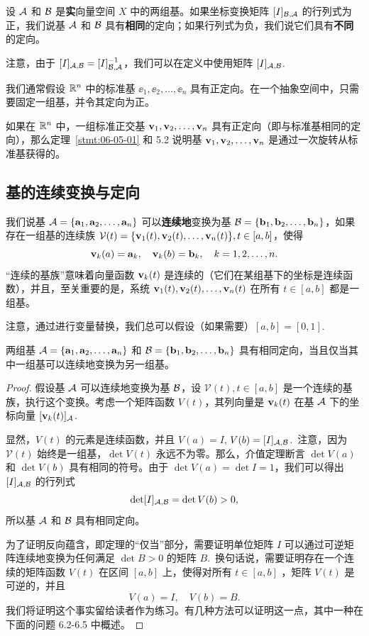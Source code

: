 设 $\mathcal{A} $ 和 $\mathcal{B}$ 是\textbf{实}向量空间 $X$ 中的两组基。如果坐标变换矩阵 $[I]_{\mathcal{B},\mathcal{A}}$ 的行列式为正，我们说基 $\mathcal{A}$ 和 $\mathcal{B}$ 具有\textbf{相同}的定向；如果行列式为负，我们说它们具有\textbf{不同}的定向。

注意，由于 $[I]_{\mathcal{A},\mathcal{B}} = [I]_{\mathcal{B},\mathcal{A}}^{-1}$，我们可以在定义中使用矩阵 $[I]_{\mathcal{A},\mathcal{B}}$.~

我们通常假设 $\mathbb{R}^n$ 中的标准基 $\ee_1, \ee_2, \dots, \ee_n$ 具有正定向。在一个抽象空间中，只需要固定一组基，并令其定向为正。

如果在 $\mathbb{R}^n$ 中，一组标准正交基 $\mathbf{v}_1, \mathbf{v}_2, \dots, \mathbf{v}_n$ 具有正定向（即与标准基相同的定向），那么定理~\ref{stmt:06-05-01} 和 5.2 说明基 $\mathbf{v}_1, \mathbf{v}_2, \dots, \mathbf{v}_n$ 是通过一次旋转从标准基获得的。


\subsection{基的连续变换与定向}\label{sec:06-06-03}

\begin{definition*}
我们说基 $\mathcal{A} = \{\mathbf{a}_1, \mathbf{a}_2, \dots, \mathbf{a}_n\}$ 可以\textbf{连续地}变换为基 $\mathcal{B} = \{\mathbf{b}_1, \mathbf{b}_2, \dots, \mathbf{b}_n\}$，如果存在一组基的连续族 $\mathcal{V}(t) = \{\mathbf{v}_1(t), \mathbf{v}_2(t), \dots, \mathbf{v}_n(t)\}, t \in [a, b]$，使得 $$\mathbf{v}_k(a) = \mathbf{a}_k,\quad \mathbf{v}_k(b) = \mathbf{b}_k,\quad k = 1, 2, \dots, n.$$
“连续的基族”意味着向量函数 $\mathbf{v}_k(t)$ 是连续的（它们在某组基下的坐标是连续函数），并且，至关重要的是，系统 $\mathbf{v}_1(t), \mathbf{v}_2(t), \dots, \mathbf{v}_n(t)$ 在所有 $t \in [a, b]$ 都是一组基。
\end{definition*}

注意，通过进行变量替换，我们总可以假设（如果需要）$[a, b] = [0, 1]$.~

\begin{theorem}\label{stmt:06-06-01}  两组基  $\mathcal{A} = \{\mathbf{a}_1, \mathbf{a}_2, \dots, \mathbf{a}_n\}$ 和 $\mathcal{B} = \{\mathbf{b}_1, \mathbf{b}_2, \dots, \mathbf{b}_n\}$ 具有相同定向，当且仅当其中一组基可以连续地变换为另一组基。\end{theorem}

\begin{proof} 假设基 $\mathcal{A}$ 可以连续地变换为基 $\mathcal{B}$，设 $\mathcal{V}(t), t \in [a, b]$ 是一个连续的基族，执行这个变换。考虑一个矩阵函数 $V(t)$，其列向量是 $\mathbf{v}_k(t)$ 在基 $\mathcal{A}$ 下的坐标向量 $[\mathbf{v}_k(t)]_{\mathcal{A}}$.~

显然，$V(t)$ 的元素是连续函数，并且 $V(a) = I$, $V(b) = [I]_{\mathcal{A},\mathcal{B}}$.~注意，因为 $\mathcal{V}(t)$ 始终是一组基，$\det V(t)$ 永远不为零。那么，介值定理断言 $\det V(a)$ 和 $\det V(b)$ 具有相同的符号。由于 $\det V(a) = \det I = 1$，我们可以得出 $[I]_{\mathcal{A},\mathcal{B}}$ 的行列式 $$\det[I]_{\mathcal{A},\mathcal{B}} = \det V(b) > 0,$$
所以基 $\mathcal{A}$ 和 $\mathcal{B}$ 具有相同定向。

为了证明反向蕴含，即定理的“仅当”部分，需要证明单位矩阵 $I$ 可以通过可逆矩阵连续地变换为任何满足 $\det B > 0$ 的矩阵 $B$.~换句话说，需要证明存在一个连续的矩阵函数 $V(t)$ 在区间 $[a, b]$ 上，使得对所有 $t \in [a, b]$ ，矩阵 $V(t)$ 是可逆的，并且
$$V(a) = I,\quad V(b) = B.$$
我们将证明这个事实留给读者作为练习。有几种方法可以证明这一点，其中一种在下面的问题 6.2-6.5 中概述。\end{proof}

